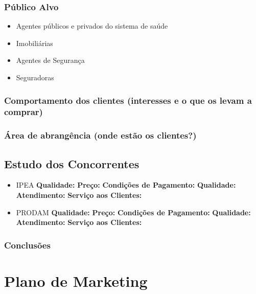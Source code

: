 \documentclass[
	12pt,				%
	openright,			%
	twoside,			%
	a4paper,			%
	english,			%
	french,				%
	spanish,			%
	brazil,				%
	]{abntex2}
\begin{document}
\subsection{Público Alvo}

\begin{itemize}
	\item Agentes públicos e privados do sistema de saúde
	\item Imobiliárias
	\item Agentes de Segurança
	\item Seguradoras
\end{itemize}

\subsection{Comportamento dos clientes (interesses e o que os levam a comprar)}


\subsection{Área de abrangência (onde estão os clientes?)}

\section{Estudo dos Concorrentes}

\begin{itemize}
	\item IPEA 
		\subitem \textbf{Qualidade:} 
		\subitem \textbf{Preço:} 
		\subitem \textbf{Condições de Pagamento:} 
		\subitem \textbf{Qualidade:} 
		\subitem \textbf{Atendimento:} 
		\subitem \textbf{Serviço aos Clientes:} 

	\item PRODAM 
		\subitem \textbf{Qualidade:} 
		\subitem \textbf{Preço:} 
		\subitem \textbf{Condições de Pagamento:} 
		\subitem \textbf{Qualidade:} 
		\subitem \textbf{Atendimento:} 
		\subitem \textbf{Serviço aos Clientes:} 
		 
\end{itemize}

\subsection*{Conclusões}



\chapter{Plano de Marketing}
\end{document}
